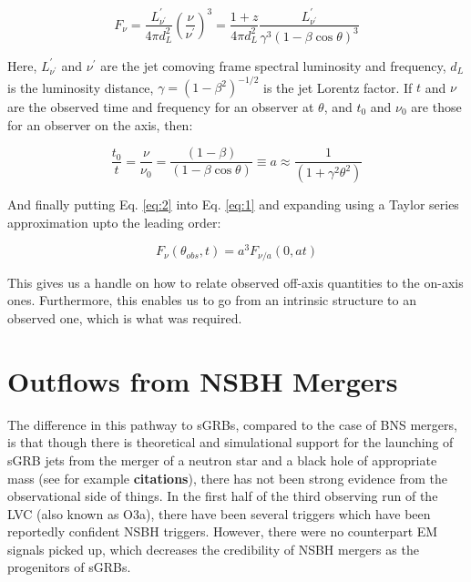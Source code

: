    \begin{equation}
        \label{eq:1}
        F_{\nu} =
           \dfrac{L^{\prime}_{\nu^{\prime}}}{4 \pi d_L^2}
           \left( \dfrac{\nu}{\nu^\prime}\right)^3
                =
            \dfrac{1 + z}{4 \pi d_L^2}
            \dfrac{L^{\prime}_{\nu^{\prime}}}{\gamma^3 (1 - \beta \cos \theta)^3}
    \end{equation}

    Here, $L^{\prime}_{\nu^{\prime}}$ and $\nu^{\prime}$ are the jet comoving
    frame spectral luminosity and frequency, $d_L$ is the luminosity distance,
    $\gamma = (1 - \beta^2)^{-1/2}$ is the jet Lorentz factor. If $t$ and $\nu$
    are the observed time and frequency  for an observer at $\theta$, and $t_0$
    and $\nu_0$ are those for an observer on the axis, then:

    \begin{equation}
        \label{eq:2}
        \dfrac{t_0}{t} =
            \dfrac{\nu}{\nu_0}
                       =
            \dfrac{(1 - \beta)}{(1 - \beta \cos \theta)}
            \equiv a
            \approx \dfrac{1}{(1 + \gamma^2 \theta^2)}
    \end{equation}

    And finally putting Eq. \ref{eq:2} into Eq. \ref{eq:1} and expanding using a
    Taylor series approximation upto the leading order:

    \begin{equation}
        \label{eq:3}
        F_{\nu}(\theta_{obs}, t) =
            a^3
            F_{\nu/a}(0, at)
    \end{equation}

    This gives us a handle on how to relate observed off-axis quantities to the
    on-axis ones. Furthermore, this enables us to go from an intrinsic structure
    to an observed one, which is what was required.

\section{Outflows from NSBH Mergers}

    The difference in this pathway to sGRBs, compared to the case of BNS mergers, is
    that though there is theoretical and simulational support for the launching of sGRB
    jets from the merger of a neutron star and a black hole of appropriate mass (see for
    example \textbf{citations}), there has not been strong evidence from the
    observational side of things. In the first half of the third observing run of the
    LVC (also known as O3a), there have been several triggers which have been reportedly
    confident NSBH triggers. However, there were no counterpart EM signals picked up,
    which decreases the credibility of NSBH mergers as the progenitors of sGRBs.\\

